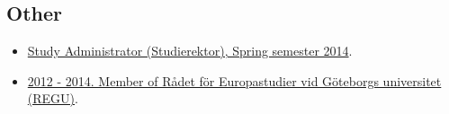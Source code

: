 \documentclass[a4paper,11pt,oneside]{article}
\begin{document}
{        \subsection{Other}
          \begin{itemize}
            \item \href{http://files.christopherkullenberg.se/studierektoronline.pdf}{Study Administrator (Studierektor), Spring semester 2014}. %
            \item \href{http://files.christopherkullenberg.se/IntygREGU.pdf}{2012 - 2014. Member of Rådet för Europastudier vid Göteborgs universitet (REGU)}. %
          \end{itemize}









}
\end{document}
